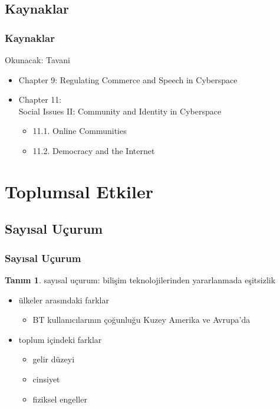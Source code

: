 \documentclass[dvipsnames]{beamer}
\theoremstyle{definition}
\newtheorem{tanim}[theorem]{Tanım}
\theoremstyle{example}
\theoremstyle{plain}
\begin{document}
\subsection*{Kaynaklar}

\begin{frame}
  \frametitle{Kaynaklar}

  \begin{block}{Okunacak: Tavani}
    \begin{itemize}
      \item Chapter 9: \alert{Regulating Commerce and Speech in Cyberspace}
      \item Chapter 11:\\
        Social Issues II: Community and Identity in Cyberspace
      \begin{itemize}
          \item 11.1. \alert{Online Communities}
          \item 11.2. \alert{Democracy and the Internet}
      \end{itemize}
    \end{itemize}
  \end{block}
\end{frame}

\section{Toplumsal Etkiler}

\subsection{Sayısal Uçurum}

\begin{frame}
  \frametitle{Sayısal Uçurum}

  \begin{tanim}
    \alert{sayısal uçurum}:
      bilişim teknolojilerinden yararlanmada eşitsizlik
  \end{tanim}

  \pause
  \begin{itemize}
    \item ülkeler arasındaki farklar
    \begin{itemize}
      \item BT kullanıcılarının çoğunluğu Kuzey Amerika ve Avrupa'da
    \end{itemize}

    \pause
    \medskip
    \item toplum içindeki farklar
    \begin{itemize}
      \item gelir düzeyi
      \item cinsiyet
      \item fiziksel engeller
    \end{itemize}
  \end{itemize}
\end{frame}
\end{document}
